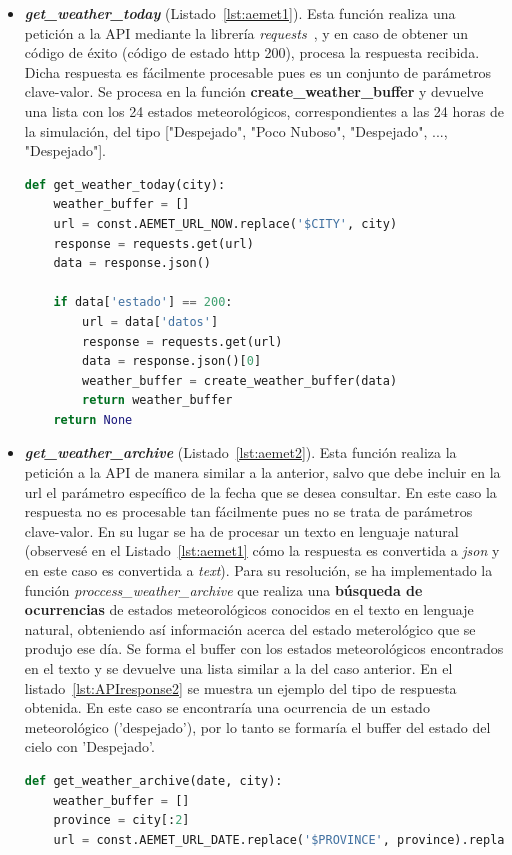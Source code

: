 \begin{itemize}
\item \textit{\textbf{get\_weather\_today}} (Listado~\ref{lst:aemet1}). Esta función realiza una petición a la \gls{API} mediante la librería \textit{requests}~\cite{Kenn11}, y en caso de obtener un código de éxito (código de estado http 200), procesa la respuesta recibida. Dicha respuesta es fácilmente procesable pues es un conjunto de parámetros clave-valor. Se procesa en la función \textbf{create\_weather\_buffer} y devuelve una lista con los 24 estados meteorológicos, correspondientes a las 24 horas de la simulación, del tipo ["Despejado", "Poco Nuboso", "Despejado", ..., "Despejado"].
\begin{lstlisting}[language=Python,float=ht,caption={Función para obtener los valores meteorológicos del día en curso},label={lst:aemet1}]
def get_weather_today(city):
    weather_buffer = []
    url = const.AEMET_URL_NOW.replace('$CITY', city)
    response = requests.get(url)
    data = response.json()

    if data['estado'] == 200:
        url = data['datos']
        response = requests.get(url)
        data = response.json()[0]
        weather_buffer = create_weather_buffer(data)
        return weather_buffer
    return None
\end{lstlisting}

\item \textit{\textbf{get\_weather\_archive}} (Listado~\ref{lst:aemet2}). Esta función realiza la petición a la \gls{API} de manera similar a la anterior, salvo que debe incluir en la url el parámetro específico de la fecha que se desea consultar. En este caso la respuesta no es procesable tan fácilmente pues no se trata de parámetros clave-valor. En su lugar se ha de procesar un texto en lenguaje natural (observesé en el Listado~\ref{lst:aemet1} cómo la respuesta es convertida a \textit{json} y en este caso es convertida a \textit{text}). Para su resolución, se ha implementado la función \textit{proccess\_weather\_archive} que realiza una \textbf{búsqueda de ocurrencias} de estados meteorológicos conocidos en el texto en lenguaje natural, obteniendo así información acerca del estado meterológico que se produjo ese día. Se forma el buffer con los estados meteorológicos encontrados en el texto y se devuelve una lista similar a la del caso anterior. En el listado~\ref{lst:APIresponse2} se muestra un ejemplo del tipo de respuesta obtenida. En este caso se encontraría una ocurrencia de un estado meteorológico ('despejado'), por lo tanto se formaría el buffer del estado del cielo con 'Despejado'.
\begin{lstlisting}[language=Python,float=ht,caption={Función para obtener los valores meteorológicos de un día concreto},label={lst:aemet2}]
def get_weather_archive(date, city):
    weather_buffer = []
    province = city[:2]
    url = const.AEMET_URL_DATE.replace('$PROVINCE', province).replace('$DATE', date)


\end{lstlisting}
\end{itemize}
